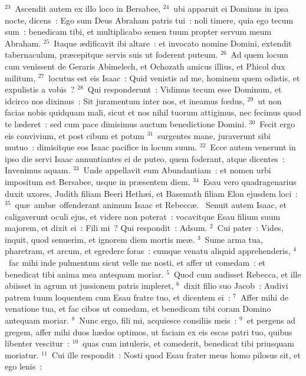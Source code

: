 ${}^{23}$~Ascendit autem ex illo loco in Bersabee,
${}^{24}$~ubi apparuit ei Dominus in ipsa nocte, dicens~: Ego sum Deus Abraham patris tui~: noli timere, quia ego tecum sum~: benedicam tibi, et multiplicabo semen tuum propter servum meum Abraham.
${}^{25}$~Itaque \ae dificavit ibi altare~: et invocato nomine Domini, extendit tabernaculum, pr\ae cepitque servis suis ut foderent puteum.
${}^{26}$~Ad quem locum cum venissent de Geraris Abimelech, et Ochozath amicus illius, et Phicol dux militum,
${}^{27}$~locutus est eis Isaac~: Quid venistis ad me, hominem quem odistis, et expulistis a vobis~?
${}^{28}$~Qui responderunt~: Vidimus tecum esse Dominum, et idcirco nos diximus~: Sit juramentum inter nos, et ineamus fœdus,
${}^{29}$~ut non facias nobis quidquam mali, sicut et nos nihil tuorum attigimus, nec fecimus quod te l\ae deret~: sed cum pace dimisimus auctum benedictione Domini.
${}^{30}$~Fecit ergo eis convivium, et post cibum et potum
${}^{31}$~surgentes mane, juraverunt sibi mutuo~: dimisitque eos Isaac pacifice in locum suum.
${}^{32}$~Ecce autem venerunt in ipso die servi Isaac annuntiantes ei de puteo, quem foderant, atque dicentes~: Invenimus aquam.
${}^{33}$~Unde appellavit eum Abundantiam~: et nomen urbi impositum est Bersabee, usque in pr\ae sentem diem.
${}^{34}$~Esau vero quadragenarius duxit uxores, Judith filiam Beeri Heth\ae i, et Basemath filiam Elon ejusdem loci~:
${}^{35}$~qu\ae\ amb\ae\ offenderant animum Isaac et Rebecc\ae .
~Senuit autem Isaac, et caligaverunt oculi ejus, et videre non poterat~: vocavitque Esau filium suum majorem, et dixit ei~: Fili mi~? Qui respondit~: Adsum.
${}^{2}$~Cui pater~: Vides, inquit, quod senuerim, et ignorem diem mortis me\ae .
${}^{3}$~Sume arma tua, pharetram, et arcum, et egredere foras~: cumque venatu aliquid apprehenderis,
${}^{4}$~fac mihi inde pulmentum sicut velle me nosti, et affer ut comedam~: et benedicat tibi anima mea antequam moriar.
${}^{5}$~Quod cum audisset Rebecca, et ille abiisset in agrum ut jussionem patris impleret,
${}^{6}$~dixit filio suo Jacob~: Audivi patrem tuum loquentem cum Esau fratre tuo, et dicentem ei~:
${}^{7}$~Affer mihi de venatione tua, et fac cibos ut comedam, et benedicam tibi coram Domino antequam moriar.
${}^{8}$~Nunc ergo, fili mi, acquiesce consiliis meis~:
${}^{9}$~et pergens ad gregem, affer mihi duos h\ae dos optimos, ut faciam ex eis escas patri tuo, quibus libenter vescitur~:
${}^{10}$~quas cum intuleris, et comederit, benedicat tibi priusquam moriatur.
${}^{11}$~Cui ille respondit~: Nosti quod Esau frater meus homo pilosus sit, et ego lenis~:
